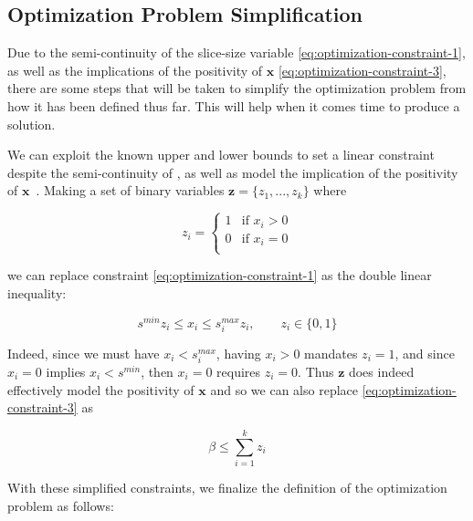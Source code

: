 \documentclass[../mthe-493-final-project.tex]{subfiles}
\begin{document}
    \subsection{Optimization Problem Simplification}
    \label{ssec:optimization-problem-simplification}
    
     Due to the semi-continuity of the slice-size variable  \eqref{eq:optimization-constraint-1}, as well as the implications of the positivity of $\mathbf{x}$ \eqref{eq:optimization-constraint-3}, there are some steps that will be taken to simplify the optimization problem from how it has been defined thus far. This will help when it comes time to produce a solution.
     
     We can exploit the known upper and lower bounds to set a linear constraint despite the semi-continuity of , as well as model the implication of the positivity of $\mathbf{x}$~\cite{9_mixed_integer_optimization_mosek_modeling_cookbook_3.2.3_2021}. Making a set of binary variables $\mathbf{z} = \{z_1,...,z_k\}$ where
     
    \[z_i =
        \begin{cases}
            1 & \text{if $x_i > 0$}\\
            0 & \text{if $x_i = 0$}\\
        \end{cases}
    \]
     
     we can replace constraint \eqref{eq:optimization-constraint-1} as the double linear inequality:
     
     \begin{equation}
         s^{min}z_i \leq x_i \leq s_i^{max}z_i, \qquad z_i \in \{0,1\}
     \end{equation}
     
     Indeed, since we must have $x_i < s_i^{max}$, having $x_i > 0$ mandates $z_i = 1$, and since $x_i = 0$ implies $x_i < s^{min}$, then $x_i = 0$ requires $z_i = 0$. Thus $\mathbf{z}$ does indeed effectively model the positivity of $\mathbf{x}$ and so we can also replace \eqref{eq:optimization-constraint-3} as
     
     \begin{equation}
         \beta \leq \sum_{i = 1}^k z_i
     \end{equation}
    
    With these simplified constraints, we finalize the definition of the optimization problem as follows:
    
\end{document}
